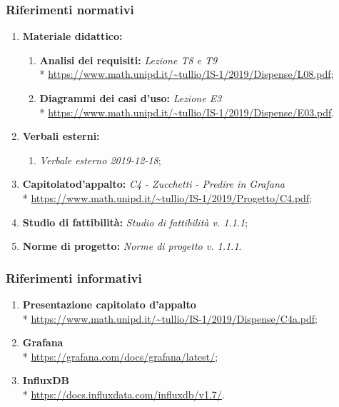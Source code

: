 		\subsubsection{Riferimenti normativi}
			\begin{enumerate}
				\item \textbf{Materiale didattico:}
				\begin{enumerate}
					\item \textbf{Analisi dei requisiti:} \textit{Lezione T8 e T9} \\*
						\url{https://www.math.unipd.it/~tullio/IS-1/2019/Dispense/L08.pdf};
					\item \textbf{Diagrammi dei casi d'uso:} \textit{Lezione E3} \\*
						\url{https://www.math.unipd.it/~tullio/IS-1/2019/Dispense/E03.pdf}.
				\end{enumerate}
				\item \textbf{Verbali esterni:} 
				\begin{enumerate}
					\item \textit{Verbale esterno 2019-12-18};
				\end{enumerate}
				\item \textbf{Capitolato\glosp d'appalto:} \textit{C4 - Zucchetti - Predire in Grafana} \\*
						\url{https://www.math.unipd.it/~tullio/IS-1/2019/Progetto/C4.pdf};
					\item \textbf{Studio di fattibilità:} \textit{Studio di fattibilità v. 1.1.1};
					\item \textbf{Norme di progetto:} \textit{Norme di progetto v. 1.1.1}.
			\end{enumerate}
		\subsubsection{Riferimenti informativi}
			\begin{enumerate}
				\item \textbf{Presentazione capitolato d'appalto} \\*
					\url{https://www.math.unipd.it/~tullio/IS-1/2019/Dispense/C4a.pdf};
				\item \textbf{Grafana} \\*
					\url{https://grafana.com/docs/grafana/latest/};
				\item \textbf{InfluxDB} \\*
					\url{https://docs.influxdata.com/influxdb/v1.7/}.
			\end{enumerate}

